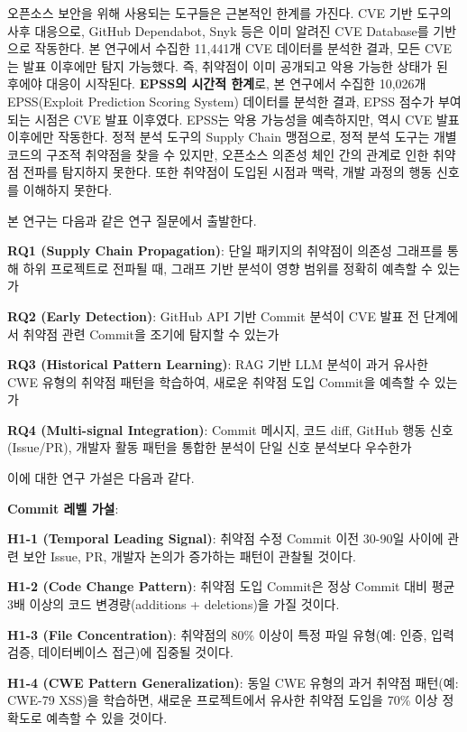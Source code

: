 ﻿\documentclass[conference]{IEEEtran}
\begin{document}
오픈소스 보안을 위해 사용되는 도구들은 근본적인 한계를 가진다. CVE 기반 도구의 사후 대응으로, GitHub Dependabot, Snyk 등은 이미 알려진 CVE Database를 기반으로 작동한다. 본 연구에서 수집한 11,441개 CVE 데이터를 분석한 결과, 모든 CVE는 발표 이후에만 탐지 가능했다. 즉, 취약점이 이미 공개되고 악용 가능한 상태가 된 후에야 대응이 시작된다. \textbf{EPSS의 시간적 한계}로, 본 연구에서 수집한 10,026개 EPSS(Exploit Prediction Scoring System) 데이터를 분석한 결과, EPSS 점수가 부여되는 시점은 CVE 발표 이후였다. EPSS는 악용 가능성을 예측하지만, 역시 CVE 발표 이후에만 작동한다. 정적 분석 도구의 Supply Chain 맹점으로, 정적 분석 도구는 개별 코드의 구조적 취약점을 찾을 수 있지만, 오픈소스 의존성 체인 간의 관계로 인한 취약점 전파를 탐지하지 못한다. 또한 취약점이 도입된 시점과 맥락, 개발 과정의 행동 신호를 이해하지 못한다.

\indent 본 연구는 다음과 같은 연구 질문에서 출발한다.

\noindent\textbf{RQ1 (Supply Chain Propagation)}: 단일 패키지의 취약점이 의존성 그래프를 통해 하위 프로젝트로 전파될 때, 그래프 기반 분석이 영향 범위를 정확히 예측할 수 있는가

\noindent\textbf{RQ2 (Early Detection)}: GitHub API 기반 Commit 분석이 CVE 발표 전 단계에서 취약점 관련 Commit을 조기에 탐지할 수 있는가

\noindent\textbf{RQ3 (Historical Pattern Learning)}: RAG 기반 LLM 분석이 과거 유사한 CWE 유형의 취약점 패턴을 학습하여, 새로운 취약점 도입 Commit을 예측할 수 있는가

\noindent\textbf{RQ4 (Multi-signal Integration)}: Commit 메시지, 코드 diff, GitHub 행동 신호(Issue/PR), 개발자 활동 패턴을 통합한 분석이 단일 신호 분석보다 우수한가

\noindent 이에 대한 연구 가설은 다음과 같다.

\noindent\textbf{Commit 레벨 가설}:

\noindent\textbf{H1-1 (Temporal Leading Signal)}: 취약점 수정 Commit 이전 30-90일 사이에 관련 보안 Issue, PR, 개발자 논의가 증가하는 패턴이 관찰될 것이다.

\noindent\textbf{H1-2 (Code Change Pattern)}: 취약점 도입 Commit은 정상 Commit 대비 평균 3배 이상의 코드 변경량(additions + deletions)을 가질 것이다.

\noindent\textbf{H1-3 (File Concentration)}: 취약점의 80\% 이상이 특정 파일 유형(예: 인증, 입력 검증, 데이터베이스 접근)에 집중될 것이다.

\noindent\textbf{H1-4 (CWE Pattern Generalization)}: 동일 CWE 유형의 과거 취약점 패턴(예: CWE-79 XSS)을 학습하면, 새로운 프로젝트에서 유사한 취약점 도입을 70\% 이상 정확도로 예측할 수 있을 것이다.
\end{document}

